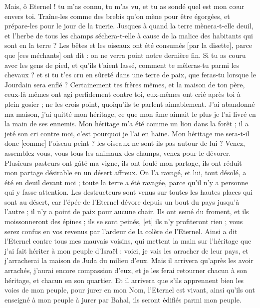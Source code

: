 \begin{multicols}{2}
Mais, ô Eternel ! tu m'as connu, tu m'as vu, et tu as sondé quel est mon cœur envers toi. Traîne-les comme des brebis qu'on mène pour être égorgées, et prépare-les pour le jour de la tuerie.
Jusques à quand la terre mènera-t-elle deuil, et l'herbe de tous les champs séchera-t-elle à cause de la malice des habitants qui sont en la terre ? Les bêtes et les oiseaux ont été consumés [par la disette], parce que [ces méchants] ont dit : on ne verra point notre dernière fin.
Si tu as couru avec les gens de pied, et qu'ils t'aient lassé, comment te mêleras-tu parmi les chevaux ? et si tu t'es cru en sûreté dans une terre de paix, que feras-tu lorsque le Jourdain sera enflé ?
Certainement tes frères mêmes, et la maison de ton père, ceux-là mêmes ont agi perfidement contre toi, eux-mêmes ont crié après toi à plein gosier ; ne les crois point, quoiqu'ils te parlent aimablement.
J'ai abandonné ma maison, j'ai quitté mon héritage, ce que mon âme aimait le plus je l'ai livré en la main de ses ennemis.
Mon héritage m'a été comme un lion dans la forêt ; il a jeté son cri contre moi, c'est pourquoi je l'ai en haine.
Mon héritage me sera-t-il donc [comme] l'oiseau peint ? les oiseaux ne sont-ils pas autour de lui ? Venez, assemblez-vous, vous tous les animaux des champs, venez pour le dévorer.
Plusieurs pasteurs ont gâté ma vigne, ils ont foulé mon partage, ils ont réduit mon partage désirable en un désert affreux.
On l'a ravagé, et lui, tout désolé, a été en deuil devant moi ; toute la terre a été ravagée, parce qu'il n'y a personne qui y fasse attention.
Les destructeurs sont venus sur toutes les hautes places qui sont au désert, car l'épée de l'Eternel dévore depuis un bout du pays jusqu’à l'autre ; il n'y a point de paix pour aucune chair.
Ils ont semé du froment, et ils moissonneront des épines ; ils se sont peinés, [et] ils n'y profiteront rien ; vous serez confus en vos revenus par l'ardeur de la colère de l'Eternel.
Ainsi a dit l'Eternel contre tous mes mauvais voisins, qui mettent la main sur l'héritage que j'ai fait hériter à mon peuple d'Israël : voici, je vais les arracher de leur pays, et j'arracherai la maison de Juda du milieu d'eux.
Mais il arrivera qu'après les avoir arrachés, j'aurai encore compassion d'eux, et je les ferai retourner chacun à son héritage, et chacun en son quartier.
Et il arrivera que s'ils apprennent bien les voies de mon peuple, pour jurer en mon Nom, l'Eternel est vivant, ainsi qu'ils ont enseigné à mon peuple à jurer par Bahal, ils seront édifiés parmi mon peuple.

\end{multicols}
